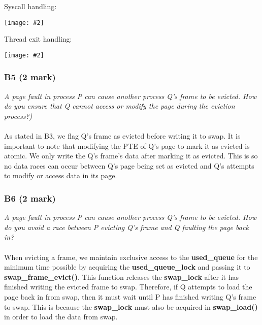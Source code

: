 \documentclass{report}
\newcommand{\question}[1]{\textit{#1} \ }
\newcommand{\fun}[1]{\textcolor{Emerald}{\textbf{#1}}}
\newcommand{\var}[1]{\textcolor{RoyalPurple}{\textbf{#1}}}
\newcommand{\centerimage}[2]{\begin{center}
	\texttt{[image: \#2]}
\end{center}}
\begin{document}
				\begin{minipage}{\textwidth}
					Syscall handling:
					\centerimage{width=\textwidth}{synch syscall.png}
				\end{minipage}

				\begin{minipage}{\textwidth}
					Thread exit handling:
					\centerimage{width=\textwidth}{synch thread exit.png}
				\end{minipage}
				
			\subsubsection*{B5 (2 mark)}
				\question{A page fault in process P can cause another process Q's frame to
				be evicted. How do you ensure that Q cannot access or modify the page 
				during the eviction process?)}
				\\
				\\As stated in B3, we flag Q's frame as evicted before writing 
				it to swap. It is important to note that modifying the PTE of 
				Q's page to mark it as evicted is atomic. We only write the Q's
				frame's data after marking it as evicted. This is so no data 
				races can occur between Q's page being set as evicted and Q's 
				attempts to modify or access data in its page.
				
			\subsubsection*{B6 (2 mark)}
				\question{A page fault in process P can cause another process Q's frame
				to be evicted. How do you avoid a race between P evicting Q's frame and 
				Q faulting the page back in?}
				\\
				\\ When evicting a frame, we maintain exclusive access to the 
				\var{used\_queue} for the minimum time possible by acquiring 
				the \var{used\_queue\_lock} and passing it to 
				\fun{swap\_frame\_evict()}. This function releases the 
				\var{swap\_lock} after it has finished writing the evicted frame
				to swap. Therefore, if Q attempts to load the page back in 
				from swap, then it must wait until P has finished writing Q's 
				frame to swap. This is because the \var{swap\_lock} must also be 
				acquired in \fun{swap\_load()} in order to load the data from 
				swap.
\end{document}
